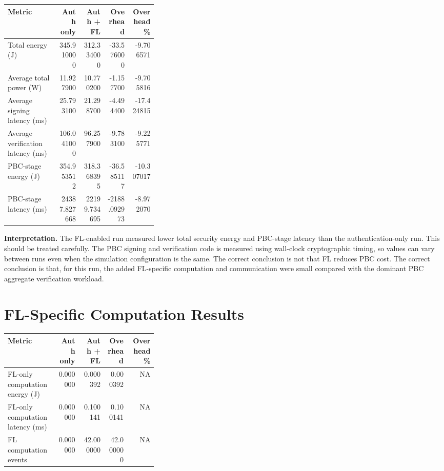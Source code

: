\documentclass[11pt,a4paper]{article}
\newcommand{\na}{\textsc{NA}}
\begin{document}
\begin{longtable}{p{0.34\linewidth}rrrr}
\toprule
\textbf{Metric} & \textbf{Auth only} & \textbf{Auth + FL} & \textbf{Overhead} & \textbf{Overhead \%} \\
\midrule
Total energy (J) & 345.910000 & 312.334000 & -33.576000 & -9.706571 \\
Average total power (W) & 11.927900 & 10.770200 & -1.157700 & -9.705816 \\
Average signing latency (ms) & 25.793100 & 21.298700 & -4.494400 & -17.424815 \\
Average verification latency (ms) & 106.041000 & 96.257900 & -9.783100 & -9.225771 \\
PBC-stage energy (J) & 354.953512 & 318.368395 & -36.585117 & -10.307017 \\
PBC-stage latency (ms) & 24387.827668 & 22199.734695 & -2188.092973 & -8.972070 \\
\bottomrule
\end{longtable}

\textbf{Interpretation.} The FL-enabled run measured lower total security energy
and PBC-stage latency than the authentication-only run. This should be treated
carefully. The PBC signing and verification code is measured using wall-clock
cryptographic timing, so values can vary between runs even when the simulation
configuration is the same. The correct conclusion is not that FL reduces PBC
cost. The correct conclusion is that, for this run, the added FL-specific
computation and communication were small compared with the dominant PBC
aggregate verification workload.

\section{FL-Specific Computation Results}

\begin{longtable}{p{0.34\linewidth}rrrr}
\toprule
\textbf{Metric} & \textbf{Auth only} & \textbf{Auth + FL} & \textbf{Overhead} & \textbf{Overhead \%} \\
\midrule
FL-only computation energy (J) & 0.000000 & 0.000392 & 0.000392 & \na \\
FL-only computation latency (ms) & 0.000000 & 0.100141 & 0.100141 & \na \\
FL computation events & 0.000000 & 42.000000 & 42.000000 & \na \\
\bottomrule
\end{longtable}
\end{document}
